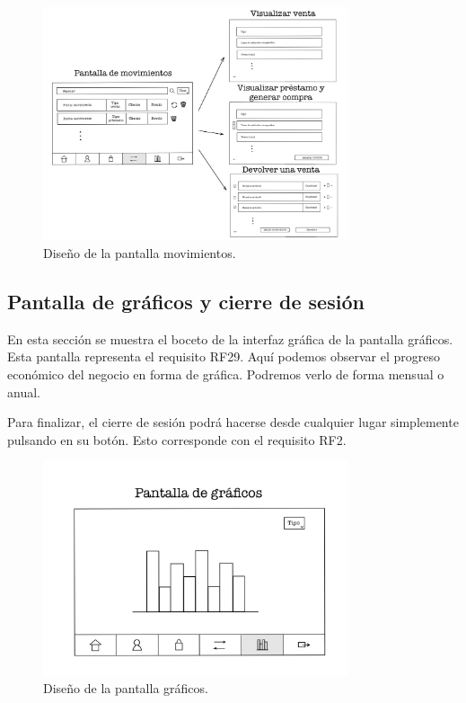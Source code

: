 \begin{figure}[ht]
	\centering
	\includegraphics[width=0.8\textwidth, angle=270]{imagenes/pantalla_movimientos.JPG}
	\caption{Diseño de la pantalla movimientos.}
	\label{fig:pantallamovimientos}
\end{figure}

\newpage

\subsection{Pantalla de gráficos y cierre de sesión}

En esta sección se muestra el boceto de la interfaz gráfica de la pantalla gráficos. Esta pantalla representa el requisito RF29. Aquí podemos observar el progreso económico del negocio en forma de gráfica. Podremos verlo de forma mensual o anual. 

Para finalizar, el cierre de sesión podrá hacerse desde cualquier lugar simplemente pulsando en su botón. Esto corresponde con el requisito RF2. 


\begin{figure}[ht]
	\centering
	\includegraphics[width=0.8\textwidth, angle=270]{imagenes/pantalla_graficos.JPG}
	\caption{Diseño de la pantalla gráficos.}
	\label{fig:pantallagraficos}
\end{figure}